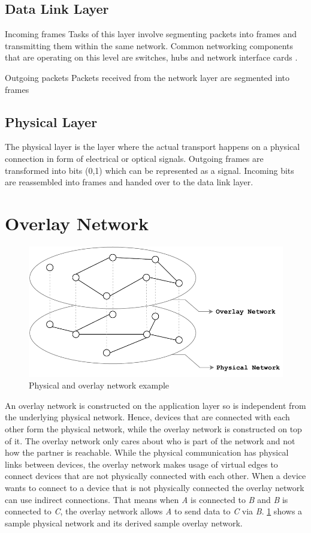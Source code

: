 \subsection{Data Link Layer}
Incoming frames\newline
Tasks of this layer involve segmenting packets into frames and transmitting them within the same network.
Common networking components that are operating on this level are switches, hubs and network interface cards \cite{simoneau2006}.

Outgoing packets\newline
Packets received from the network layer are segmented into frames 

\subsection{Physical Layer}
The physical layer is the layer where the actual transport happens on a physical connection in form of electrical or optical signals.
Outgoing frames are transformed into bits (0,1) which can be represented as a signal.
Incoming bits are reassembled into frames and handed over to the data link layer.


\section{Overlay Network}
\begin{figure}[htb!]
\centering
\includegraphics[width=.5\textwidth]{graphics/physical-vs-overlay-network.pdf}
\caption{Physical and overlay network example}
\label{fig:overlay}
\end{figure}
An overlay network is constructed on the application layer so is independent from the underlying physical network. 
Hence, devices that are connected with each other form the physical network, while the overlay network is constructed on top of it. The overlay network only cares about who is part of the network and not how the partner is reachable. 
While the physical communication has physical links between devices, the overlay network makes usage of virtual edges to connect devices that are not physically connected with each other. When a device wants to connect to a device that is not physically connected the overlay network can use indirect connections. That means when \textit{A} is connected to \textit{B} and \textit{B} is connected to \textit{C}, the overlay network allows \textit{A} to send data to \textit{C} via \textit{B}.
\cref{fig:overlay} shows a sample physical network and its derived sample overlay network.

